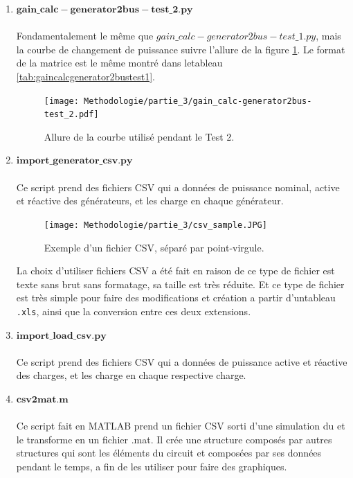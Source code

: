 \begin{enumerate}[\bfseries 4.3.1]
	\item $\mathbf{gain\_calc-generator2bus-test\_2.py}$\\
	\\Fondamentalement le même que $gain\_calc-generator2bus-test\_1.py$, mais la courbe de changement de puissance suivre l'allure de la figure \ref{fig:gaincalcgenerator2bustest2}. Le format de la matrice est le même montré dans letableau \ref{tab:gaincalcgenerator2bustest1}.
	\begin{figure}[H]
		\begin{center}	
			\texttt{[image: Methodologie/partie\_3/gain\_calc-generator2bus-test\_2.pdf]}
			\caption{Allure de la courbe utilisé pendant le Test 2.}
			\label{fig:gaincalcgenerator2bustest2}
		\end{center}
	\end{figure}
	\item $\mathbf{import\_generator\_csv.py}$\\
	\\Ce script prend des fichiers \gls{CSV} qui a données de puissance nominal, active et réactive des générateurs, et les charge en chaque générateur.
	\begin{figure}[H]
		\begin{center}	
			\texttt{[image: Methodologie/partie\_3/csv\_sample.JPG]}
			\caption{Exemple d'un fichier CSV, séparé par point-virgule.}
			\label{fig:csv_sample}
		\end{center}
	\end{figure}
	La choix d'utiliser fichiers \gls{CSV} a été fait en raison de ce type de fichier est texte sans brut sans formatage, sa taille est très réduite. Et ce type de fichier est très simple pour faire des modifications et création a partir d'untableau \verb|.xls|, ainsi que la conversion entre ces deux extensions.  
	\\
	\item $\mathbf{import\_load\_csv.py}$\\
	\\Ce script prend des fichiers \gls{CSV} qui a données de puissance active et réactive des charges, et les charge en chaque respective charge.
	\\
	\item $\mathbf{csv2mat.m}$\\
	\\Ce script fait en MATLAB prend un fichier \gls{CSV} sorti d'une simulation du \powerfactory et le transforme en un fichier .mat. Il crée une structure composés par autres structures qui sont les éléments du circuit et composées par ses données  pendant le temps, a fin de les utiliser pour faire des graphiques.

\end{enumerate}
